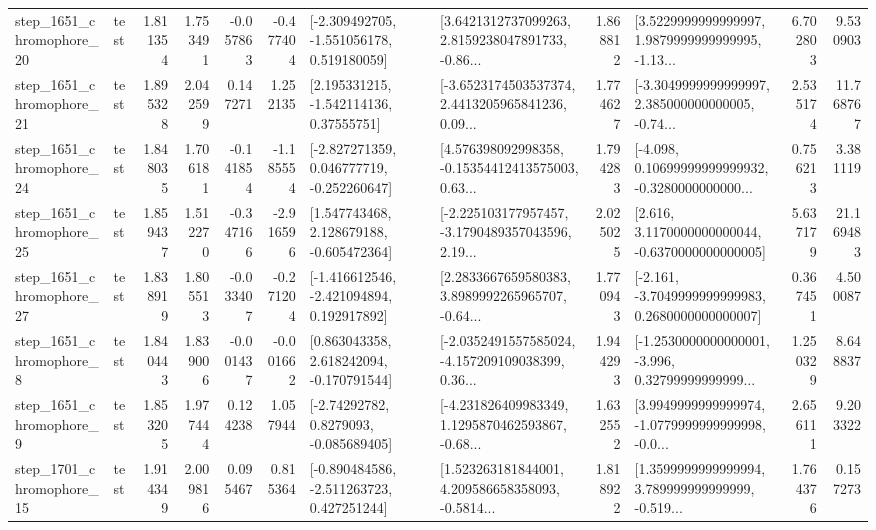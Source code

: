 \begin{tabular}{llrrrrllrlrr}
 step\_1651\_chromophore\_20 &      test &      1.811354 &    1.753491 &     -0.057863 & -0.477404 &   [-2.309492705, -1.551056178, 0.519180059] &  [3.6421312737099263, 2.8159238047891733, -0.86... &       1.868812 &  [3.5229999999999997, 1.9879999999999995, -1.13... &            6.702803 &          9.530903 \\
 step\_1651\_chromophore\_21 &      test &      1.895328 &    2.042599 &      0.147271 &  1.252135 &     [2.195331215, -1.542114136, 0.37555751] &  [-3.6523174503537374, 2.4413205965841236, 0.09... &       1.774627 &  [-3.3049999999999997, 2.385000000000005, -0.74... &            2.535174 &         11.768767 \\
 step\_1651\_chromophore\_24 &      test &      1.848035 &    1.706181 &     -0.141854 & -1.185554 &   [-2.827271359, 0.046777719, -0.252260647] &  [4.576398092998358, -0.15354412413575003, 0.63... &       1.794283 &  [-4.098, 0.10699999999999932, -0.3280000000000... &            0.756213 &          3.381119 \\
 step\_1651\_chromophore\_25 &      test &      1.859437 &    1.512270 &     -0.347166 & -2.916596 &    [1.547743468, 2.128679188, -0.605472364] &  [-2.225103177957457, -3.1790489357043596, 2.19... &       2.025025 &   [2.616, 3.1170000000000044, -0.6370000000000005] &            5.637179 &         21.169483 \\
 step\_1651\_chromophore\_27 &      test &      1.838919 &    1.805513 &     -0.033407 & -0.271204 &   [-1.416612546, -2.421094894, 0.192917892] &  [2.2833667659580383, 3.8989992265965707, -0.64... &       1.770943 &  [-2.161, -3.7049999999999983, 0.2680000000000007] &            0.367451 &          4.500087 \\
  step\_1651\_chromophore\_8 &      test &      1.840443 &    1.839006 &     -0.001437 & -0.001662 &    [0.863043358, 2.618242094, -0.170791544] &  [-2.0352491557585024, -4.157209109038399, 0.36... &       1.944293 &  [-1.2530000000000001, -3.996, 0.32799999999999... &            1.250329 &          8.648837 \\
  step\_1651\_chromophore\_9 &      test &      1.853205 &    1.977444 &      0.124238 &  1.057944 &      [-2.74292782, 0.8279093, -0.085689405] &  [-4.231826409983349, 1.1295870462593867, -0.68... &       1.632552 &  [3.9949999999999974, -1.0779999999999998, -0.0... &            2.656111 &          9.203322 \\
 step\_1701\_chromophore\_15 &      test &      1.914349 &    2.009816 &      0.095467 &  0.815364 &   [-0.890484586, -2.511263723, 0.427251244] &  [1.523263181844001, 4.209586658358093, -0.5814... &       1.818922 &  [1.3599999999999994, 3.789999999999999, -0.519... &            1.764376 &          0.157273 \\

\end{tabular}
